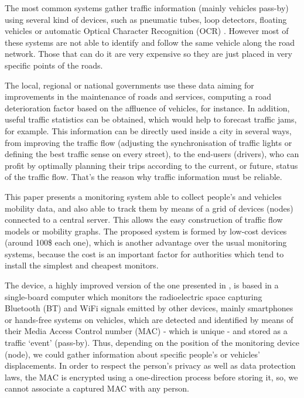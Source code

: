 \documentclass[preprint]{elsarticle}
\begin{document}
The most common systems gather traffic information (mainly vehicles pass-by) using several kind of devices, such as pneumatic tubes, loop detectors, floating vehicles or automatic Optical Character Recognition (OCR) \cite{rodrigue2013geography}. However most of these systems are not able to identify and follow the same vehicle along the road network. 
Those that can do it are very expensive so they are just placed in very specific points of the roads.

The local, regional or national governments use these data aiming for improvements in the maintenance of roads and services, computing a road deterioration factor based on the affluence of vehicles, for instance. In addition, useful traffic statistics can be obtained, which would help to forecast traffic jams, for example.
This information can be directly used inside a city in several ways, from improving the traffic flow (adjusting the synchronisation of traffic lights or defining the best traffic sense on every street), to the end-users (drivers), who can profit by optimally planning their trips according to the current, or future, status of the traffic flow. 
That's the reason why traffic information must be reliable. 

This paper presents a monitoring system able to collect people's and vehicles mobility data, and also able to track them by means of a grid of devices (nodes) connected to a central server. This allows the easy construction of traffic flow models or mobility graphs. The proposed system is formed by low-cost devices (around 100\$ each one), which is another advantage over the usual monitoring systems, because the cost is an important factor for authorities which
tend to install the simplest and cheapest monitors. 

The device, a highly improved version of the one presented in
\cite{castillo2014_book_sipesca}, is based in a single-board computer
which monitors the radioelectric space capturing Bluetooth (BT) and
WiFi signals emitted by other devices,  mainly
smartphones or hands-free systems on vehicles, which are detected and
identified by means of their Media Access Control number (MAC) - which
is unique - and stored as a traffic `event' (pass-by). 
Thus, depending on the position of the monitoring device (node), we could
gather information about specific people's or vehicles'
displacements. In order to respect the person's privacy as well as
data protection laws, the MAC is encrypted using a one-direction
process before storing it, so, we cannot associate a captured MAC with
any person. 
\end{document}
